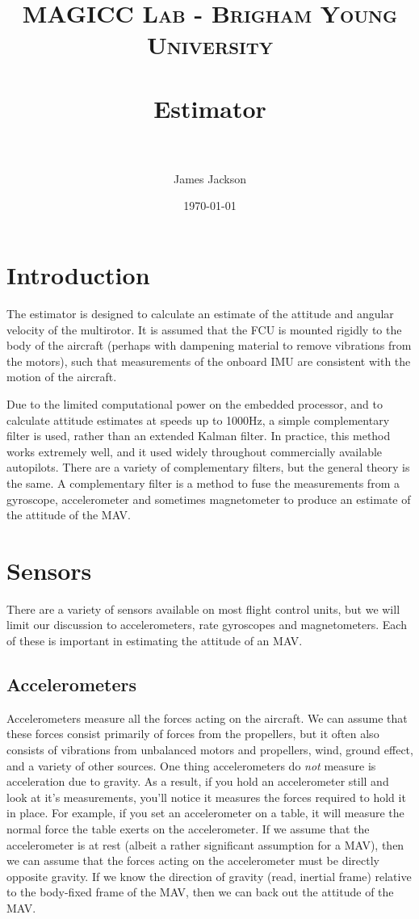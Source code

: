 \documentclass[paper=a4, fontsize=11pt]{scrartcl} %
\title{
\normalfont \normalsize
\textsc{MAGICC Lab - Brigham Young University} \\ [25pt] %
\horrule{0.5pt} \\[0.4cm] %
\huge Estimator \\ %
\horrule{2pt} \\[0.5cm] %
}
\author{James Jackson} %
\date{\normalsize\today} %
\numberwithin{equation}{section} %
\numberwithin{figure}{section} %
\numberwithin{table}{section} %
\begin{document}
\maketitle %


\section{Introduction}

The estimator is designed to calculate an estimate of the attitude and angular velocity of the multirotor.  It is assumed that the FCU is mounted rigidly to the body of the aircraft (perhaps with dampening material to remove vibrations from the motors), such that measurements of the onboard IMU are consistent with the motion of the aircraft.

Due to the limited computational power on the embedded processor, and to calculate attitude estimates at speeds up to 1000Hz, a simple complementary filter is used, rather than an extended Kalman filter.  In practice, this method works extremely well, and it used widely throughout commercially available autopilots.  There are a variety of complementary filters, but the general theory is the same.  A complementary filter is a method to fuse the measurements from a gyroscope, accelerometer and sometimes magnetometer to produce an estimate of the attitude of the MAV.

\section{Sensors}
There are a variety of sensors available on most flight control units, but we will limit our discussion to accelerometers, rate gyroscopes and magnetometers.  Each of these is important in estimating the attitude of an MAV.

\subsection{Accelerometers}

Accelerometers measure all the forces acting on the aircraft.  We can assume that these forces consist primarily of forces from the propellers, but it often also consists of vibrations from unbalanced motors and propellers, wind, ground effect, and a variety of other sources. One thing accelerometers do \textit{not} measure is acceleration due to gravity.  As a result, if you hold an accelerometer still and look at it's measurements, you'll notice it measures the forces required to hold it in place.  For example, if you set an accelerometer on a table, it will measure the normal force the table exerts on the accelerometer.  If we assume that the accelerometer is at rest (albeit a rather significant assumption for a MAV), then we can assume that the forces acting on the accelerometer must be directly opposite gravity.  If we know the direction of gravity (read, inertial frame) relative to the body-fixed frame of the MAV, then we can back out the attitude of the MAV.  
\end{document}
